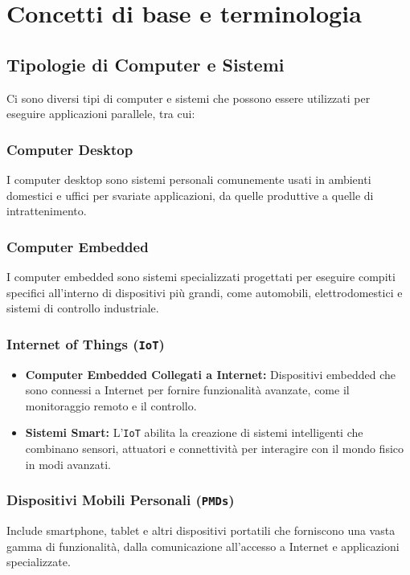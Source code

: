 \section{Concetti di base e terminologia}
\subsection{Tipologie di Computer e Sistemi}
Ci sono diversi tipi di computer e sistemi che possono
essere utilizzati per eseguire applicazioni parallele, tra cui:
\subsubsection{Computer Desktop}
I computer desktop sono sistemi personali comunemente usati in ambienti domestici e uffici per svariate applicazioni, da quelle produttive a quelle di intrattenimento.

\subsubsection{Computer Embedded}
I computer embedded sono sistemi specializzati progettati per eseguire compiti specifici all'interno di dispositivi più grandi, come automobili, elettrodomestici e sistemi di controllo industriale.

\subsubsection{Internet of Things (\texttt{IoT})}
\begin{itemize}
    \item \textbf{Computer Embedded Collegati a Internet:} Dispositivi embedded che sono connessi a Internet per fornire funzionalità avanzate, come il monitoraggio remoto e il controllo.
    \item \textbf{Sistemi Smart:} L'\texttt{IoT} abilita la creazione di sistemi intelligenti che combinano sensori, attuatori e connettività per interagire con il mondo fisico in modi avanzati.
\end{itemize}

\subsubsection{Dispositivi Mobili Personali (\texttt{PMDs})}
Include smartphone, tablet e altri dispositivi portatili che forniscono una vasta gamma di funzionalità, dalla comunicazione all'accesso a Internet e applicazioni specializzate.

